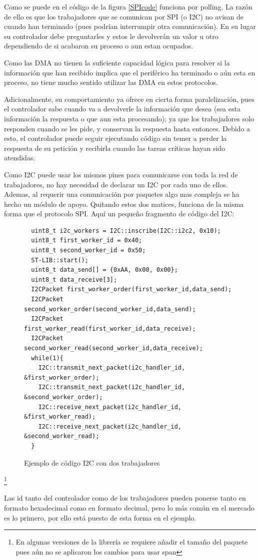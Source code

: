 \documentclass{report}
\begin{document}
\par \vspace{0.3cm}
Como se puede en el código de la figura \ref{SPIcode} funciona por polling. La razón de ello es que los trabajadores que se comunican por SPI (o I2C) no avisan de cuando han terminado (pues podrían interrumpir otra comunicación). En su lugar su controlador debe preguntarles y estos le devolverán un valor u otro dependiendo de si acabaron su proceso o aun estan ocupados. \par
Como las DMA no tienen la suficiente capacidad lógica para resolver si la información que han recibido implica que el periférico ha terminado o aún esta en proceso, no tiene mucho sentido utilizar las DMA en estos protocolos. \par 
Adicionalmente, su comportamiento ya ofrece en cierta forma paralelización, pues el controlador sabe cuando va a devolverle la información que desea (sea esta información la respuesta o que aun esta procesando); ya que los trabajadores solo responden cuando se les pide, y conservan la respuesta hasta entonces. Debido a esto, el controlador puede seguir ejecutando código sin temer a perder la respuesta de su petición y recibirla cuando las tareas críticas hayan sido atendidas. 
\par \vspace{0.3cm}
Como I2C puede usar los mismos pines para comunicarse con toda la red de trabajadores, no hay necesidad de declarar un I2C por cada uno de ellos. Ademas, al requerir una comunicación por paquetes algo mas compleja se ha hecho un módulo de apoyo. Quitando estos dos matices, funciona de la misma forma que el protocolo SPI. Aquí un pequeño fragmento de código del I2C:
\begin{figure}[h]
\begin{lstlisting}
  uint8_t i2c_workers = I2C::inscribe(I2C::i2c2, 0x10);
  uint8_t first_worker_id = 0x40;
  uint8_t second_worker_id = 0x50;
  ST-LIB::start();
  uint8_t data_send[] = {0xAA, 0x00, 0x00}; 
  uint8_t data_receive[3]; 
  I2CPacket first_worker_order(first_worker_id,data_send);
  I2CPacket second_worker_order(second_worker_id,data_send);
  I2CPacket first_worker_read(first_worker_id,data_receive);
  I2CPacket second_worker_read(second_worker_id,data_receive);
  while(1){
    I2C::transmit_next_packet(i2c_handler_id, &first_worker_order);
    I2C::transmit_next_packet(i2c_handler_id, &second_worker_order);
    I2C::receive_next_packet(i2c_handler_id, &first_worker_read);
    I2C::receive_next_packet(i2c_handler_id, &second_worker_read);
  }
\end{lstlisting}
\caption{Ejemplo de código I2C con dos trabajadores}
\label{I2Ccode}
\end{figure}
\footnote{En algunas versiones de la librería se requiere añadir el tamaño del paquete pues aún no se aplicaron los cambios para usar span}
\par \vspace{0.3cm}
Las id tanto del controlador como de los trabajadores pueden ponerse tanto en formato hexadecimal como en formato decimal, pero lo más común en el mercado es lo primero, por ello está puesto de esta forma en el ejemplo. 
\end{document}
